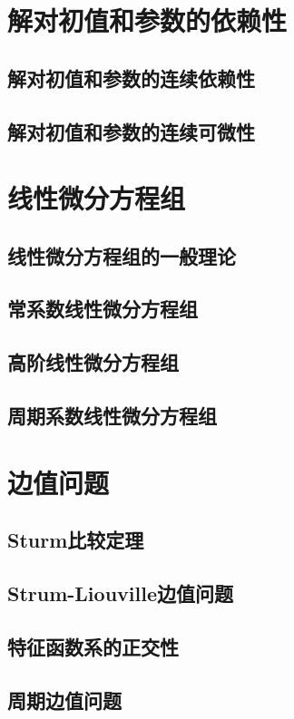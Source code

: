 \documentclass[lang=cn,10pt]{elegantbook}
\begin{document}
\chapter{解对初值和参数的依赖性}
\section{解对初值和参数的连续依赖性}
\section{解对初值和参数的连续可微性}
\newpage

\chapter{线性微分方程组}
\section{线性微分方程组的一般理论}
\section{常系数线性微分方程组}
\section{高阶线性微分方程组}
\section{周期系数线性微分方程组}
\newpage

\chapter{边值问题}
\section{Sturm比较定理}
\section{Strum-Liouville边值问题}
\section{特征函数系的正交性}
\section{周期边值问题}
\newpage
\end{document}

